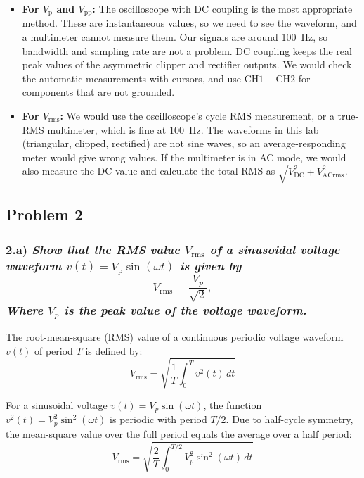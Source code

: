 \begin{itemize}
    \item \textbf{For $V_\mathrm{p}$ and $V_{\mathrm{pp}}$:} The oscilloscope with DC coupling is the most appropriate method. These are instantaneous values, so we need to see the waveform, and a multimeter cannot measure them. Our signals are around \SI{100}{\hertz}, so bandwidth and sampling rate are not a problem. DC coupling keeps the real peak values of the asymmetric clipper and rectifier outputs. We would check the automatic measurements with cursors, and use $\mathrm{CH1} - \mathrm{CH2}$ for components that are not grounded.
    \item \textbf{For $V_{\mathrm{rms}}$:} We would use the oscilloscope's cycle RMS measurement, or a true-RMS multimeter, which is fine at \SI{100}{\hertz}. The waveforms in this lab (triangular, clipped, rectified) are not sine waves, so an average-responding meter would give wrong values. If the multimeter is in AC mode, we would also measure the DC value and calculate the total RMS as $\sqrt{V_{\mathrm{DC}}^2 + V_{\mathrm{ACrms}}^2}$.
\end{itemize}

\clearpage
\subsection*{Problem 2}
\subsubsection*{2.a) \normalfont\itshape Show that the RMS value $V_\mathrm{rms}$ of a sinusoidal voltage waveform $v(t) = V_\mathrm{p}\sin(\omega t)$ is given by
\begin{equation*}
    V_\mathrm{rms} = \frac{V_{p}}{\sqrt{2}},
\end{equation*}
Where $V_{p}$ is the peak value of the voltage waveform.}

The root-mean-square (RMS) value of a continuous periodic voltage waveform $v(t)$ of period $T$ is defined by:
\begin{equation*}
    V_{\text{rms}} = \sqrt{\frac{1}{T} \int_{0}^{T} v^2(t) \, dt}
\end{equation*}

For a sinusoidal voltage $v(t) = V_p \sin(\omega t)$, the function $v^2(t) = V_p^2 \sin^2(\omega t)$ is periodic with period $T/2$. 
Due to half-cycle symmetry, the mean-square value over the full period equals the average over a half period:
\begin{equation*}
    V_{\text{rms}} = \sqrt{\frac{2}{T} \int_{0}^{T/2} V_p^2 \sin^2(\omega t) \, dt}
\end{equation*}

